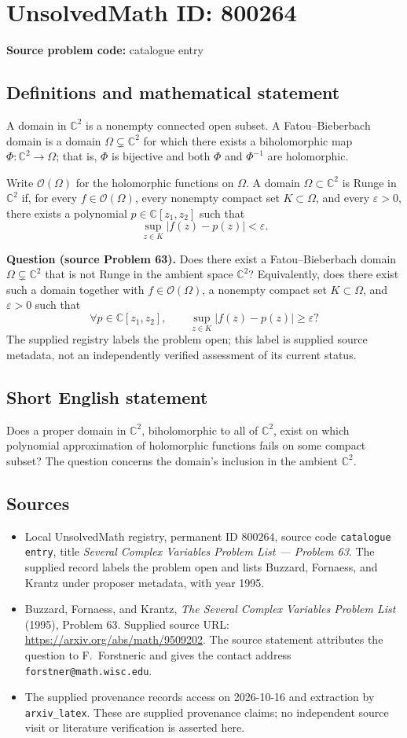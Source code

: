 \documentclass[11pt]{article}
\newcommand{\C}{\mathbb{C}}
\begin{document}
\section*{UnsolvedMath ID: 800264}
\textbf{Source problem code:} catalogue entry
\subsection{Definitions and mathematical statement}
A domain in \(\C^2\) is a nonempty connected open subset. A Fatou--Bieberbach domain is a domain \(\Omega\subsetneq\C^2\) for which there exists a biholomorphic map \(\Phi:\C^2\to\Omega\); that is, \(\Phi\) is bijective and both \(\Phi\) and \(\Phi^{-1}\) are holomorphic.

Write \(\mathcal O(\Omega)\) for the holomorphic functions on \(\Omega\). A domain \(\Omega\subset\C^2\) is Runge in \(\C^2\) if, for every \(f\in\mathcal O(\Omega)\), every nonempty compact set \(K\subset\Omega\), and every \(\varepsilon>0\), there exists a polynomial \(p\in\C[z_1,z_2]\) such that
\[
\sup_{z\in K}|f(z)-p(z)|<\varepsilon.
\]

\textbf{Question (source Problem 63).} Does there exist a Fatou--Bieberbach domain \(\Omega\subsetneq\C^2\) that is not Runge in the ambient space \(\C^2\)? Equivalently, does there exist such a domain together with \(f\in\mathcal O(\Omega)\), a nonempty compact set \(K\subset\Omega\), and \(\varepsilon>0\) such that
\[
\forall p\in\C[z_1,z_2],\qquad
\sup_{z\in K}|f(z)-p(z)|\geq\varepsilon?
\]
The supplied registry labels the problem open; this label is supplied source metadata, not an independently verified assessment of its current status.
\subsection{Short English statement}
Does a proper domain in \(\C^2\), biholomorphic to all of \(\C^2\), exist on which polynomial approximation of holomorphic functions fails on some compact subset? The question concerns the domain's inclusion in the ambient \(\C^2\).
\subsection{Sources}
\begin{itemize}
\item Local UnsolvedMath registry, permanent ID \(800264\), source code \texttt{catalogue entry}, title \emph{Several Complex Variables Problem List --- Problem 63}. The supplied record labels the problem open and lists Buzzard, Fornaess, and Krantz under proposer metadata, with year 1995.
\item Buzzard, Fornaess, and Krantz, \emph{The Several Complex Variables Problem List} (1995), Problem 63. Supplied source URL: \url{https://arxiv.org/abs/math/9509202}. The source statement attributes the question to F.~Forstneric and gives the contact address \texttt{forstner@math.wisc.edu}.
\item The supplied provenance records access on 2026-10-16 and extraction by \texttt{arxiv\_latex}. These are supplied provenance claims; no independent source visit or literature verification is asserted here.
\end{itemize}
\end{document}

